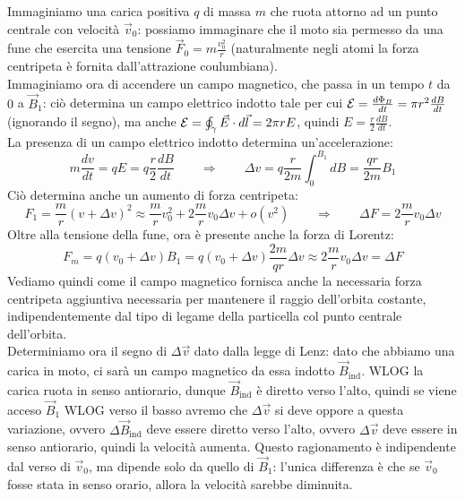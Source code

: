 Immaginiamo una carica positiva $ q $ di massa $ m $ che ruota attorno ad un punto centrale con velocità $ \vec{v}_0 $: possiamo immaginare che il moto sia permesso da una fune che esercita una tensione $ \vec{F}_0 = m \frac{v_0^2}{r} $ (naturalmente negli atomi la forza centripeta è fornita dall'attrazione coulumbiana). \\ 
%
Immaginiamo ora di accendere un campo magnetico, che passa in un tempo $ t $ da $ 0 $ a $ \vec{B}_1 $: ciò determina un campo elettrico indotto tale per cui $ \mathcal{E} = \frac{d\Phi_B}{dt} = \pi r^2 \frac{dB}{dt} $ (ignorando il segno), ma anche $ \mathcal{E} = \oint_{\gamma} \vec{E} \cdot d\vec{l} = 2\pi r E $, quindi $ E = \frac{r}{2}\frac{dB}{dt} $. \\ 
%
La presenza di un campo elettrico indotto determina un'accelerazione:
\begin{equation}
	m \frac{dv}{dt} = qE = q \frac{r}{2} \frac{dB}{dt} \qquad\Longrightarrow\qquad \Delta v = q \frac{r}{2m} \int_0^{B_1} dB = \frac{qr}{2m} B_1
	\label{eq:3}
\end{equation}
Ciò determina anche un aumento di forza centripeta:
\begin{equation}
	F_1 = \frac{m}{r} (v + \Delta v)^2 \approx \frac{m}{r} v_0^2 + 2 \frac{m}{r} v_0 \Delta v + o(v^2) \qquad\Longrightarrow\qquad \Delta F = 2 \frac{m}{r} v_0 \Delta v
	\label{eq:4}
\end{equation}
Oltre alla tensione della fune, ora è presente anche la forza di Lorentz:
\begin{equation}
	F_m = q (v_0 + \Delta v) B_1 = q (v_0 + \Delta v) \frac{2m}{qr} \Delta v \approx 2 \frac{m}{r} v_0 \Delta v = \Delta F
	\label{eq:5}
\end{equation}
Vediamo quindi come il campo magnetico fornisca anche la necessaria forza centripeta aggiuntiva necessaria per mantenere il raggio dell'orbita costante, indipendentemente dal tipo di legame della particella col punto centrale dell'orbita. \\ 
%
Determiniamo ora il segno di $ \Delta\vec{v} $ dato dalla legge di Lenz: dato che abbiamo una carica in moto, ci sarà un campo magnetico da essa indotto $ \vec{B}_{\text{ind}} $. WLOG la carica ruota in senso antiorario, dunque $ \vec{B}_{\text{ind}} $ è diretto verso l'alto, quindi se viene acceso $ \vec{B}_1 $ WLOG verso il basso avremo che $ \Delta\vec{v} $ si deve oppore a questa variazione, ovvero $ \Delta\vec{B}_{\text{ind}} $ deve essere diretto verso l'alto, ovvero $ \Delta\vec{v} $ deve essere in senso antiorario, quindi la velocità aumenta. Questo ragionamento è indipendente dal verso di $ \vec{v}_0 $, ma dipende solo da quello di $ \vec{B}_1 $: l'unica differenza è che se $ \vec{v}_0 $ fosse stata in senso orario, allora la velocità sarebbe diminuita.

